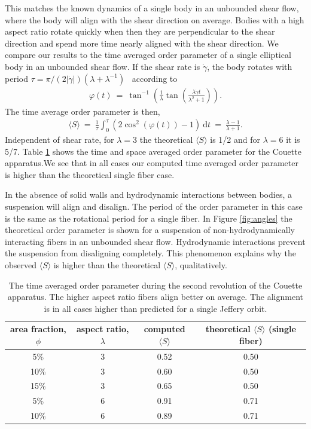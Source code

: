 \documentclass[AMA,STIX1COL]{WileyNJD-v2}
\begin{document}
This matches the known dynamics of a single body in an unbounded shear
flow, where the body will align with the shear direction on average.
Bodies with a high aspect ratio rotate quickly when then they are
perpendicular to the shear direction and spend more time nearly aligned
with the shear direction. We compare our results to the time averaged
order parameter of a single elliptical body in an unbounded shear flow.
If the shear rate is $\dot{\gamma}$, the body rotates with period $\tau
= \pi/(2| \dot{\gamma}|)(\lambda + \lambda^{-1})$~\cite{Jeffery1922}
according to 
\begin{align*}
  \varphi(t) ~=~ \tan^{-1}\left(\frac{1}{\lambda}\tan\left(
    \frac{\lambda \dot{\gamma}t}{\lambda^2 + 1}\right)\right).
\end{align*}
The time average order parameter is then,
\begin{align*}
  \langle S\rangle ~=~ \frac{1}{\tau}\int_0^\tau\left( 
    2\cos^2(\varphi(t)) - 1\right)~\text{d}t ~=~ \frac{\lambda -1}{\lambda+1}.
\end{align*}
Independent of shear rate, for $\lambda= 3$ the theoretical $\langle
S\rangle$ is 1/2 and for $\lambda=6$ it is  5/7. Table \ref{tab:order}
shows the time and space averaged order parameter for the Couette
apparatus.We see that in all cases our computed time averaged order
parameter is higher than the theoretical single fiber case. 

In the absence of solid walls and hydrodynamic interactions between
bodies, a suspension will align and disalign. The period of the order
parameter in this case is the same as the rotational period for a single
fiber. In Figure \ref{fig:angles} the theoretical order parameter is
shown for a suspension of non-hydrodynamically interacting fibers in an
unbounded shear flow.  Hydrodynamic interactions prevent the suspension
from disaligning completely. This phenomenon explains why the observed
$\langle S\rangle$ is higher than the theoretical $\langle S\rangle$,
qualitatively.

\begin{table}[t]
  \centering
  \caption{The time averaged order parameter during the second
  revolution of the Couette apparatus. The higher aspect ratio fibers
  align better on average. The alignment is in all cases higher than
predicted for a single Jeffery orbit. \label{tab:order}}
\begin{tabular*}{500pt}{@{\extracolsep\fill}cccc@{\extracolsep\fill}}
    \toprule
area fraction, $\phi$ & aspect ratio, $\lambda$ & computed $ \langle S \rangle$ & theoretical
$\langle S \rangle$ (single fiber)\\
\midrule
5\%  & 3 & 0.52 & 0.50 \\
10\% & 3 & 0.60 & 0.50 \\
15\% & 3 & 0.65 & 0.50 \\
5\%  & 6 & 0.91 & 0.71 \\
10\% & 6 & 0.89 & 0.71 \\
\bottomrule
\end{tabular*}
\end{table} 
\end{document}
